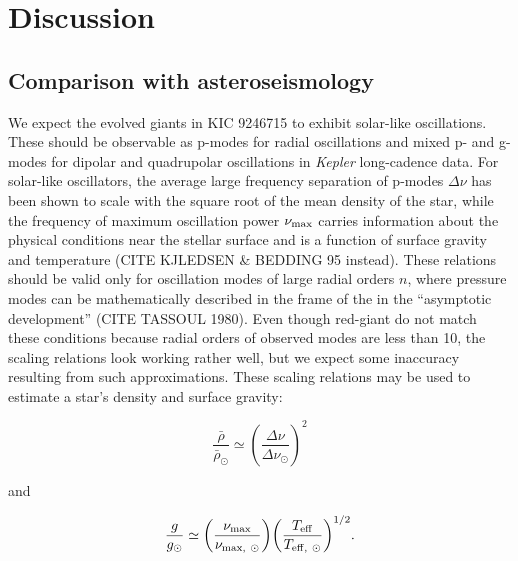 \section{Discussion}\label{discuss}

\subsection{Comparison with asteroseismology}\label{seismo}

We expect the evolved giants in KIC 9246715 to exhibit solar-like oscillations. These should be observable as p-modes for radial oscillations and mixed p- and g- modes for dipolar and quadrupolar oscillations in \emph{Kepler} long-cadence data. For solar-like oscillators, the average large frequency separation of p-modes $\Delta \nu$ has been shown to scale with the square root of the mean density of the star, while the frequency of maximum oscillation power $\nu_{\rm{max}}$ carries information about the physical conditions near the stellar surface and is a function of surface gravity and temperature \citep{cha13} (CITE KJLEDSEN \& BEDDING 95 instead). These relations should be valid only for oscillation modes of large radial orders $n$, where pressure modes can be mathematically described in the frame of the  in the ``asymptotic development'' (CITE TASSOUL 1980). Even though red-giant do not match these conditions because radial orders of observed modes are less than 10, the scaling relations look working rather well, but we expect some inaccuracy resulting from such approximations.  These scaling relations may be used to estimate a star's density and surface gravity:

\begin{equation} \label{density}
{\frac{\bar{\rho}}{\bar{\rho}_{\odot}}} \simeq {\left( \frac{\Delta \nu}{\Delta \nu_{\odot}} \right)}^{2}
\end{equation}

and

\begin{equation} \label{gravity}
{\frac{g}{g_{\odot}}} \simeq {\left( \frac{\nu_{\rm{max}}}{\nu_{\rm{max}, \ \odot}} \right)} {\left( \frac{T_{\rm{eff}}}{T_{\rm{eff}, \ \odot}} \right)}^{1/2}.
\end{equation}


